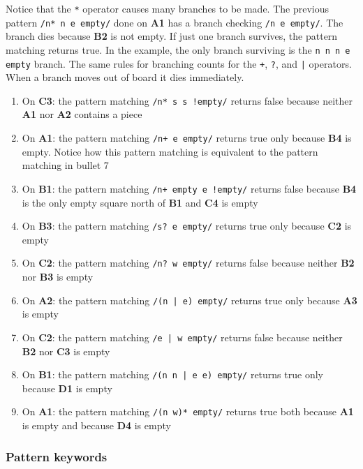 Notice that the \texttt{*} operator causes many branches to be made. The
previous pattern \texttt{/n* n e empty/} done on \textbf{A1}  has a branch checking
\texttt{/n e empty/}. The branch dies because \textbf{B2} is not empty. If just one
branch survives, the pattern matching returns true. In the example, the only branch
surviving is the \texttt{n n n e empty} branch. The same rules for branching
counts for the \texttt{+}, \texttt{?}, and \texttt{|} operators. When a branch
moves out of board it dies immediately.

\begin{enumerate}
  \item On \textbf{C3}: the pattern matching \texttt{/n* s s !empty/} returns
    false because neither \textbf{A1} nor \textbf{A2} contains a piece
  \item On \textbf{A1}: the pattern matching \texttt{/n+ e empty/} returns true
    only because \textbf{B4} is empty. Notice how this pattern matching is
    equivalent to the pattern matching in bullet 7
  \item On \textbf{B1}: the pattern matching \texttt{/n+ empty e !empty/}
    returns false because \textbf{B4} is the only empty square north of
    \textbf{B1} and \textbf{C4} is empty
  \item On \textbf{B3}: the pattern matching \texttt{/s? e empty/} returns true
    only because \textbf{C2} is empty 
  \item On \textbf{C2}: the pattern matching \texttt{/n? w empty/} returns false
    because neither \textbf{B2} nor \textbf{B3} is empty
  \item On \textbf{A2}: the pattern matching \texttt{/(n | e) empty/} returns
    true only because \textbf{A3} is empty
  \item On \textbf{C2}: the pattern matching \texttt{/e | w empty/} returns
    false because neither \textbf{B2} nor \textbf{C3} is empty
  \item On \textbf{B1}: the pattern matching \texttt{/(n n | e e) empty/}
    returns true only because \textbf{D1} is empty
  \item On \textbf{A1}: the pattern matching \texttt{/(n w)* empty/} returns
    true both because \textbf{A1} is empty and because \textbf{D4} is empty
\end{enumerate}

\subsubsection{Pattern keywords}

